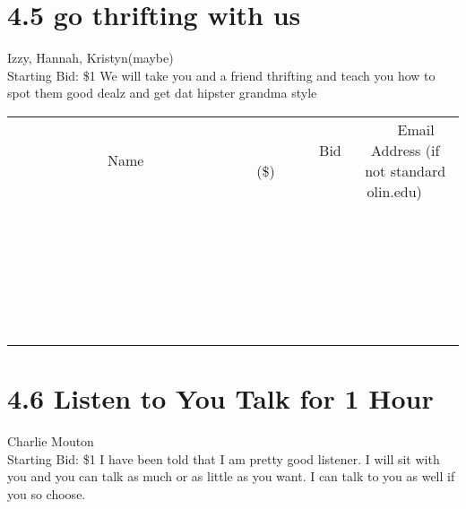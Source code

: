 \documentclass[11pt]{article}
\begin{document}
\section*{4.5 go thrifting with us}
Izzy, Hannah, Kristyn(maybe)
\\
Starting Bid: \$1
\newline
We will take you  and a friend thrifting and teach you how to spot them good dealz and get dat hipster grandma style
\\[6ex]
\begin{tabular}{c c c}
~~~~~~~~~~~~~Name~~~~~~~~~~~~~ & ~~~~~~~~~Bid (\$)~~~~~~~~~  & ~~~Email Address (if not standard olin.edu)~~~\\
 & & \\
\hline
 & & \\
\hline
 & & \\
\hline
 & & \\
\hline
 & & \\
\hline
 & & \\
\hline
 & & \\
\hline
 & & \\
\hline
 & & \\
\hline
 & & \\
\hline
 & & \\
\hline
 & & \\
\hline
 & & \\
\hline
 & & \\
\hline
 & & \\
\hline
 & & \\
\hline
 & & \\
\hline
 & & \\
\hline
 & & \\
\hline
 & & \\
\hline
 & & \\
\hline
 & & \\
\hline
 & & \\
\hline
 & & \\
\hline
 & & \\
\hline
 & & \\
\hline
\end{tabular}
\newpage
\section*{4.6 Listen to You Talk for 1 Hour}
Charlie Mouton
\\
Starting Bid: \$1
\newline
I have been told that I am pretty good listener. I will sit with you and you can talk as much or as little as you want. I can talk to you as well if you so choose.
\end{document}
